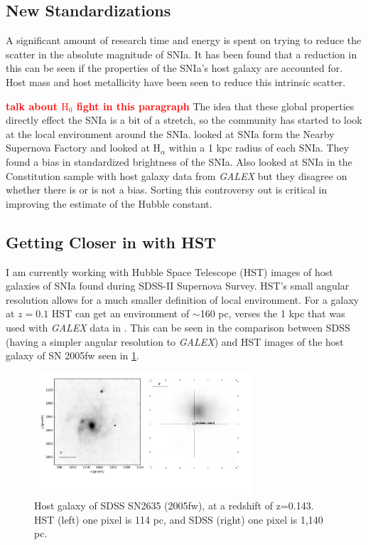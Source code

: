 \documentclass[apj, iop]{emulateapj}
\newcommand{\sn}{SNIa}
\newcommand{\todo}[1]{\textbf{\textcolor{red}{#1}}}
\newcommand{\Hubble}{\ensuremath{\text{H}_0}}
\begin{document}
\subsection{New Standardizations}\label{new-standardizations}

A significant amount of research time and energy is spent on trying to reduce
the scatter in the absolute magnitude of \sn{}. It has been found that a
reduction in this can be seen if the properties of the \sn{}'s host galaxy are
accounted for. Host mass \citep{Childress13} and host metallicity
\citep{Hayden13} have been seen to reduce this intrinsic scatter.

\todo{talk about \Hubble{} fight in this paragraph}
The idea that these global properties directly effect the \sn{} is a bit of a
stretch, so the community has started to look at the local environment around
the \sn{}. \cite{Rigault13} looked at \sn{} form the Nearby Supernova Factory
and looked at H$_{\alpha}$ within a 1 kpc radius of each \sn{}. They found  a
bias in standardized brightness of the \sn{}. Also \cite{Rigault15, Jones15}
looked at \sn{} in the Constitution sample with host galaxy data from {\it
GALEX} but they disagree on whether there is or is not a bias. Sorting this
controversy out is critical in improving the estimate of the Hubble constant.

\subsection{Getting Closer in with HST}\label{hst}

I am currently working with Hubble Space Telescope (HST) images of host galaxies
of \sn{} found during SDSS-II Supernova Survey. HST's small angular resolution
allows for a much smaller definition of local environment. For a galaxy at $z =
0.1$ HST can get an environment of $\sim$160 pc, verses the 1 kpc that was used
with {\it GALEX} data in \cite{Jones15,Rigault15}. This can be seen in the
comparison between SDSS (having a simpler angular resolution to {\it GALEX}) and
HST images of the host galaxy of SN 2005fw seen in \cref{f:galaxy-compare}.

\begin{figure}
	\includegraphics[width=3.2in]{SN2635-combined-inverted.pdf}
	\caption{Host galaxy of SDSS SN2635 (2005fw), at a redshift of z=0.143. HST 
	(left) one pixel is 114 pc, and SDSS (right) one pixel is 1,140 pc.}
	\label{f:galaxy-compare}
\end{figure}
\end{document}
